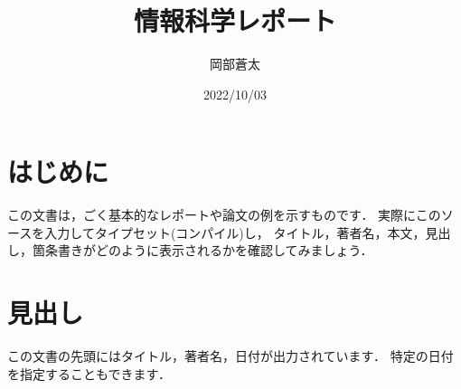\documentclass[a4paper, 11pt, uplatex]{jsarticle}
\begin{document}
\title{情報科学レポート}
\author{岡部蒼太}
\date{2022/10/03}
\maketitle

\section{はじめに}
この文書は，ごく基本的なレポートや論文の例を示すものです．
実際にこのソースを入力してタイプセット(コンパイル)し，
タイトル，著者名，本文，見出し，箇条書きがどのように表示されるかを確認してみましょう．

\section{見出し}
この文書の先頭にはタイトル，著者名，日付が出力されています．
特定の日付を指定することもできます．
\end{document}
